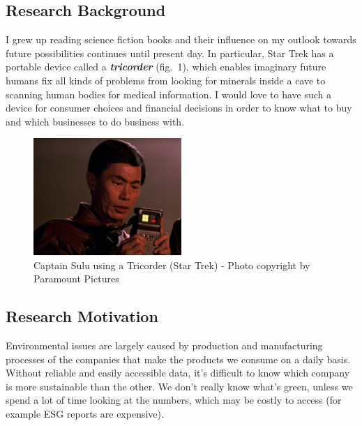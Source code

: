 \documentclass[
  letterpaper,
  DIV=11,
  numbers=noendperiod]{scrartcl}
\begin{document}
\subsection{Research Background}\label{research-background}

I grew up reading science fiction books and their influence on my
outlook towards future possibilities continues until present day. In
particular, Star Trek has a portable device called a
\textbf{\emph{tricorder}} (fig.~1), which enables imaginary future
humans fix all kinds of problems from looking for minerals inside a cave
to scanning human bodies for medical information. I would love to have
such a device for consumer choices and financial decisions in order to
know what to buy and which businesses to do business with.

\begin{figure}[H]

{\centering \includegraphics[width=0.5\textwidth,height=\textheight]{./images/tricorder.jpg}

}

\caption{Captain Sulu using a Tricorder (Star Trek) - Photo copyright by
Paramount Pictures}

\end{figure}%

\subsection{Research Motivation}\label{research-motivation}

Environmental issues are largely caused by production and manufacturing
processes of the companies that make the products we consume on a daily
basis. Without reliable and easily accessible data, it's difficult to
know which company is more sustainable than the other. We don't really
know what's green, unless we spend a lot of time looking at the numbers,
which may be costly to access (for example ESG reports are expensive).
\end{document}
